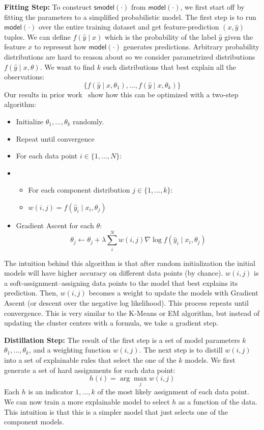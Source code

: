 \vspace{0.5em} \noindent \textbf{Fitting Step: } To construct $\textsf{smodel}(\cdot)$ from $\textsf{model}(\cdot)$, we first start off by fitting the parameters to a simplified probabilistic model. 
The first step is to run $\textsf{model}(\cdot)$ over the entire training dataset and get feature-prediction $(x, \hat{y})$ tuples.
We can define $f(\hat{y} \mid x)$ which is the probability of the label $\hat{y}$ given the feature $x$ to represent how $\textsf{model}(\cdot)$ generates predictions. 
Arbitrary probability distributions are hard to reason about so we consider parametrized distributions $f(\hat{y} \mid x, \theta)$. 
We want to find $k$ such distributions that best explain all the observations:
\[
\{f(\hat{y} \mid x, \theta_1),...,f(\hat{y} \mid x, \theta_k)\}
\]
Our results in prior work~\cite{krishnan17} show how this can be optimized with a two-step algorithm:
\begin{itemize}
    \item Initialize $\theta_1,...,\theta_k$ randomly.
    \item Repeat until convergence
    \item For each data point $i \in \{1,...,N\}$: 
    \item \begin{itemize} 
          \item For each component distribution $j \in \{1,...,k\}$:
          \item $w(i,j) = f(\hat{y}_i \mid x_i, \theta_j)$
    \end{itemize}
    \item Gradient Ascent for each $\theta$:
    \[ \theta_j \leftarrow \theta_j + \lambda \sum_i^N w(i,j) \nabla \log f(\hat{y}_i \mid x_i, \theta_j)  \]
\end{itemize}

The intuition behind this algorithm is that after random initialization the initial models will have higher accuracy on different data points (by chance). $w(i,j)$ is a soft-assignment--assigning data points to the model that best explains its prediction. Then, $w(i,j)$ becomes a weight to update the models with Gradient Ascent (or descent over the negative log likelihood). This process repeats until convergence. This is very similar to the K-Means or EM algorithm, but instead of updating the cluster centers with a formula, we take a gradient step.

\vspace{0.5em} \noindent \textbf{Distillation Step: } The result of the first step is a set of model parameters $k$ $\theta_1,...,\theta_k$, and a weighting function $w(i,j)$. The next step is to distill $w(i,j)$ into a set of explainable rules that select the one of the $k$ models. We first generate a set of hard assignments for each data point:
\[
h(i) = \arg\max_{j} w(i,j)
\]
Each $h$ is an indicator $1,...,k$ of the most likely assignment of each data point.
We can now train a more explainable model to select $h$ as a function of the data.
This intuition is that this is a simpler model that just selects one of the component models.

